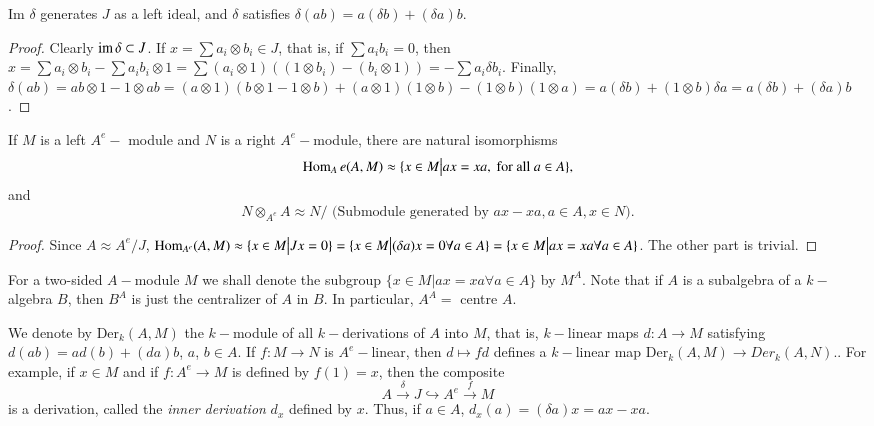 \setcounter{lemma}{1}
\begin{lemma}%
Im $\delta$ generates $J$ as a left ideal, and $\delta$ satisfies
  $\delta(ab) = a (\delta b) + (\delta a)b$. 
\end{lemma}

\begin{proof}
Clearly $\operatorname{im} \delta \subset J$. If $x = \sum a_i \otimes b_i \in J$,
that is, if $\sum a_i b_i = 0$, then $x= \sum a_i \otimes b_i - \sum
a_i b_i \otimes 1 = \sum (a_i \otimes 1) ((1 \otimes b_i) - (b_i
\otimes 1)) = - \sum a_i \delta b_i$. Finally,\pageoriginale $\delta (ab) = ab
\otimes 1-1 \otimes ab = (a \otimes 1) (b \otimes 1-1 \otimes b) + (a
\otimes 1) (1 \otimes b) - (1 \otimes b) (1\otimes a) = a (\delta b) +
(1 \otimes b) \delta a = a(\delta b) + (\delta a)b$. 
\end{proof}

\setcounter{coro}{2}
\begin{coro}\label{chap3:coro1.3} %
If $M$ is a left $A^e-$ module and $N$ is a right $A^e -$module,
there are natural isomorphisms 
$$
\operatorname{Hom}_A e(A, M) \approx \{ x \in M \big| ax = xa, \text{ for all } a \in A \},
$$
 and 
$$
N \otimes_{A^e} A \approx N/ \text{ (Submodule generated by } ax - xa,
a \in A, x \in N). 
$$
\end{coro}

\begin{proof}
Since $A \approx A^e /J$, $\operatorname{Hom}_{A^e} (A, M) \approx \{ x \in M \big|
Jx = 0 \} = \{ x \in M \big| (\delta a)x = 0 \forall a \in A \} = \{ x
\in M \big| ax = xa \forall a \in A \}$. The other part is trivial. 
\end{proof}

For a two-sided $A-$module $M$ we shall denote the subgroup $\{x \in
M \big| ax = xa \forall a \in A \}$ by $M^A$. Note that if $A$ is a
subalgebra of a $k-$algebra $B$, then $B^A$ is just the centralizer of
$A$ in $B$. In particular, $A^A = $ centre $A$. 

We denote by Der$_k(A, M)$ the $k-$module of all $k-$derivations of
$A$ into $M$, that is, $k-$linear maps $d : A \to M$ satisfying $d(ab)
= ad(b) + (da)b$, $a$, $b \in A$. If $f: M \to N$ is $A^e-$linear,
then $d \mapsto f d$ defines a $k-$linear map Der$_k (A, M) \to Der_k
(A,N).$. For example, if $x \in M$ and if $f : A^e \to M$ is
defined by $f(1) = x$, then the composite 
$$
A \xrightarrow{\delta} J \hookrightarrow A^e \xrightarrow{f}M 
$$
is a derivation, called the \textit{inner derivation} $d_x$ defined
by $x$. Thus, if $a \in A$, $d_x (a) = (\delta a) x = ax - xa$. 

